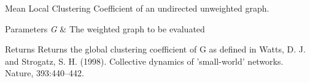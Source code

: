 Mean Local Clustering Coefficient of an undirected unweighted graph. 


\begin{DoxyParams}{Parameters}
{\em G} & The weighted graph to be evaluated \\
\hline
\end{DoxyParams}
\begin{DoxyReturn}{Returns}
Returns the global clustering coefficient of G as defined in Watts, D. J. and Strogatz, S. H. (1998). Collective dynamics of ’small-\/world’ networks. Nature, 393\+:440–442. 
\end{DoxyReturn}
